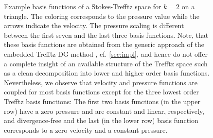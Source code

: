 \documentclass[pdflatex,sn-mathphys,Numbered]{sn-jnl}%
\theoremstyle{remark}%
\theoremstyle{definition}%
\begin{document}
\begin{figure}[!ht]
    \caption{Example basis functions of a Stokes-Trefftz space for
    $k=2$ on a triangle. The coloring corresponds to the pressure
    value while the arrows indicate the velocity. The pressure scaling
    is different between the first seven and the last three basis
    functions. Note, that these basis functions are obtained from the
    generic approach of the embedded Trefftz-DG method
    \cite{2201.07041}, cf. \cref{sec:impl}, and hence do not offer a
    complete insight of an available structure of the Trefftz space
    such as a clean decomposition into lower and higher order basis
    functions. Nevertheless, we observe that velocity and pressure
    functions are coupled for most basis functions except for the
    three lowest order Trefftz basis functions: The first two basis
    functions (in the upper row) have a zero pressure and are constant
    and linear, respectively, and divergence-free and the last (in the
    lower row) basis function corresponds to a zero velocity and a
    constant pressure.}
    \label{fig:trefftzbasis}
\end{figure}
\end{document}
